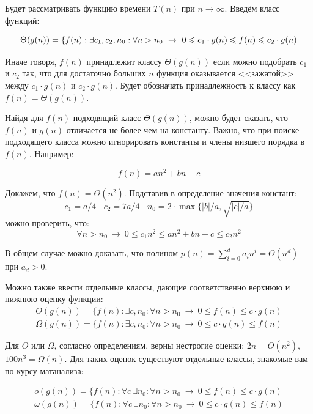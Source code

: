 \documentclass[12pt,a4paper]{report}
\providecommand{\abs}[1]{\left\lvert{#1}\right\rvert}
\begin{document}
Будет рассматривать функцию времени $T(n)$ при $n \to \infty$. Введём класс функций:

$$
\Theta(g(n)) = \{f(n) : \exists c_1, c_2, n_0: \forall n > n_0 ~\to~ 0 \leqslant c_1 \cdot g(n) \leqslant f(n) \leqslant c_2 \cdot g(n) \\
$$

Иначе говоря, $f(n)$ принадлежит классу $\Theta(g(n))$ если можно подобрать $c_1$ и $c_2$ так, что для достаточно больших $n$ функция оказывается <<зажатой>> между $c_1 \cdot g(n)$ и $c_2 \cdot g(n)$. Будет обозначать принадлежность к классу как $f(n) = \Theta(g(n))$.

Найдя для $f(n)$ подходящий класс $\Theta(g(n))$, можно будет сказать, что $f(n)$ и $g(n)$ отличается не более чем на константу. Важно, что при поиске подходящего класса можно игнорировать константы и члены низшего порядка в $f(n)$. Например:

$$
f(n) = an^2 + bn + c
$$

Докажем, что $f(n) = \Theta(n^2)$. Подставив в определение значения констант:
$$
c_1 = a/4 ~~~~ c_2 = 7a/4 ~~~~ n_0 = 2 \cdot \max\{\abs{b}/a, \sqrt{\abs{c}/a}\}
$$
можно проверить, что:
$$
\forall n > n_0 ~\to~ 0 \leqslant c_1 n^2 \leqslant an^2 + bn + c \leqslant c_2 n^2
$$

В общем случае можно доказать, что полином $p(n) = \sum_{i=0}^{d} a_i n^i = \Theta(n^d)$ при $a_d > 0$.

Можно также ввести отдельные классы, дающие соответственно верхнюю и нижнюю оценку функции:
$$
\begin{gathered}
O(g(n)) = \{f(n) : \exists c, n_0: \forall n > n_0 ~\to~ 0 \leqslant f(n) \leqslant c \cdot g(n) \\
\Omega(g(n)) = \{f(n) : \exists c, n_0: \forall n > n_0 ~\to~ 0 \leqslant c \cdot g(n) \leqslant f(n)
\end{gathered}
$$

Для $O$ или $\Omega$, согласно определениям, верны нестрогие оценки: $2n = O(n^2)$, $100n^3 = \Omega(n)$. Для таких оценок существуют отдельные классы, знакомые вам по курсу матанализа:

$$
\begin{gathered}
o(g(n)) = \{f(n) : \forall c ~ \exists n_0: \forall n > n_0 ~\to~ 0 \leqslant f(n) \leqslant c \cdot g(n) \\
\omega(g(n)) = \{f(n) : \forall c ~ \exists n_0: \forall n > n_0 ~\to~ 0 \leqslant c \cdot g(n) \leqslant f(n)
\end{gathered}
$$
\end{document}
